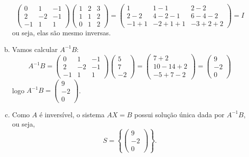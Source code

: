 \documentclass[a4paper,10pt]{article}
\newenvironment{sol}{\begin{tcolorbox}[breakable,colback=blue!5!white,colframe=blue!40!white,title=\normalsize {\sc{Solução}},coltitle=black]}{\end{tcolorbox}}
\begin{document}
\begin{sol}
\begin{enumerate}[a)]
		\[\begin{pmatrix}
		0&1&-1\\2&-2&-1\\-1&1&1
		\end{pmatrix}\begin{pmatrix}
		1&2&3\\1&1&2\\0&1&2
		\end{pmatrix}=\begin{pmatrix}
		1 & 1-1 & 2-2\\
		2-2 & 4-2-1 & 6-4-2\\
		-1+1 & -2+1+1 & -3+2+2
		\end{pmatrix}=I\]ou seja, elas são mesmo inversas.
		\item Vamos calcular $A^{-1}B$:
		\[A^{-1}B=\begin{pmatrix}
		0&1&-1\\2&-2&-1\\-1&1&1
		\end{pmatrix}\begin{pmatrix}
		5\\7\\-2
		\end{pmatrix}=\begin{pmatrix}
		7+2\\10-14+2\\-5+7-2
		\end{pmatrix}=\begin{pmatrix}
		9\\-2\\0
		\end{pmatrix}\]logo $A^{-1}B=\begin{pmatrix}
		9\\-2\\0
		\end{pmatrix}$.
		\item Como $A$ é inversível, o sistema $AX=B$ possui solução única dada por $A^{-1}B$, ou seja,
		\[S=\left\{\begin{pmatrix}
		9\\-2\\0
		\end{pmatrix}\right\}.\]
	\end{enumerate}
\end{sol}
\pagebreak
\end{document}
